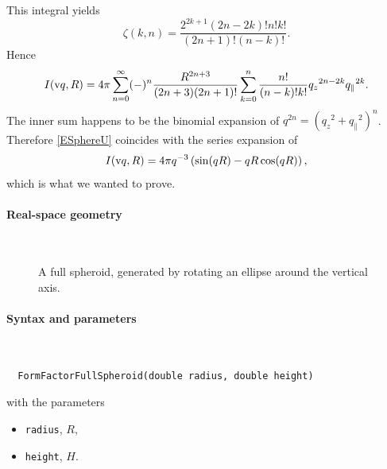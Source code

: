 This integral \cite[no.\ 2.512.4]{GrRy07} yields
\begin{equation}
  \zeta(k,n)
  = \frac{2^{2k+1}(2n-2k)! n! k!}{(2n+1)!(n-k)!}.
\end{equation}
Hence
\begin{equation}\label{ESphereU}
  I(\text{v}{q},R)
  = 4\pi \sum_{n=0}^\infty (-)^n \frac{R^{2n+3}}{(2n+3)(2n+1)!}
    \sum_{k=0}^n \frac{n!}{(n-k)!k!}{q_z}^{2n-2k}{q_\parallel}^{2k}.
\end{equation}
The inner sum happens to be the binomial expansion of
$q^{2n}=\left({q_z}^2+{q_\parallel}^2\right)^n$.
Therefore \cref{ESphereU} coincides with the series expansion of
\begin{equation}
  I(\text{v}{q},R)
  = 4\pi q^{-3} \left( \sin(qR) - qR\cos(qR) \right),
\end{equation}
which is what we wanted to prove.

 \label{SFullSpheroid}

\paragraph{Real-space geometry}\strut\\

\begin{figure}[H]
\hfill
{}
\hfill
{}
\hfill
{}
\hfill
\caption{A full spheroid, generated by rotating an ellipse around the vertical axis.}
\end{figure}

\FloatBarrier

\paragraph{Syntax and parameters}\strut\\[-2ex plus .2ex minus .2ex]
\begin{lstlisting}
  FormFactorFullSpheroid(double radius, double height)
\end{lstlisting}
with the parameters
\begin{itemize}
\item \texttt{radius}, $R$,
\item \texttt{height}, $H$.
\end{itemize}


